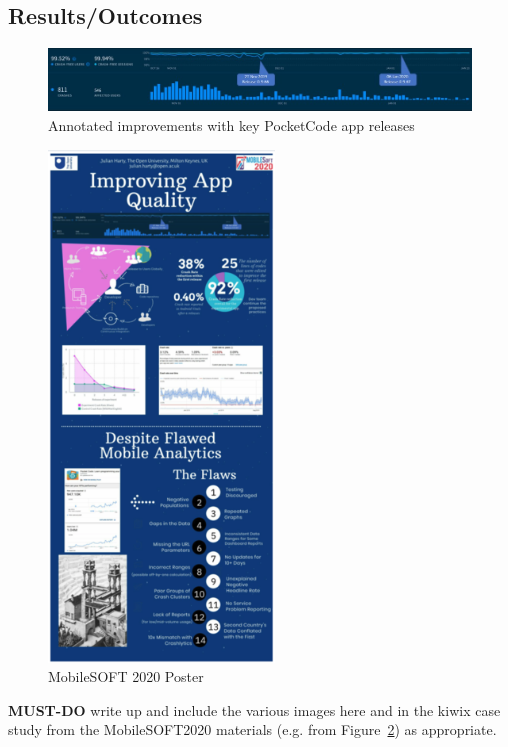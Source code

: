\subsection{Results/Outcomes}

\begin{figure}
    \centering
    \includegraphics[width=16cm]{images/annotated_pocketcode_90_day_fabric_crashlytics_report.jpg}
    \caption{Annotated improvements with key PocketCode app releases}
    \label{fig:annotated-improvements-pocketcode-app-releases}
\end{figure}

\begin{figure}
    \centering
    \includegraphics[width=6cm]{images/mobilesoft/resized-mobilesoft2020-poster.png}
    \caption{MobileSOFT 2020 Poster}
    \label{fig:mobilesoft2020-poster}
\end{figure}

\textbf{MUST-DO} write up and include the various images here and in the kiwix case study from the MobileSOFT2020 materials (e.g. from Figure~\ref{fig:mobilesoft2020-poster}) as appropriate.

